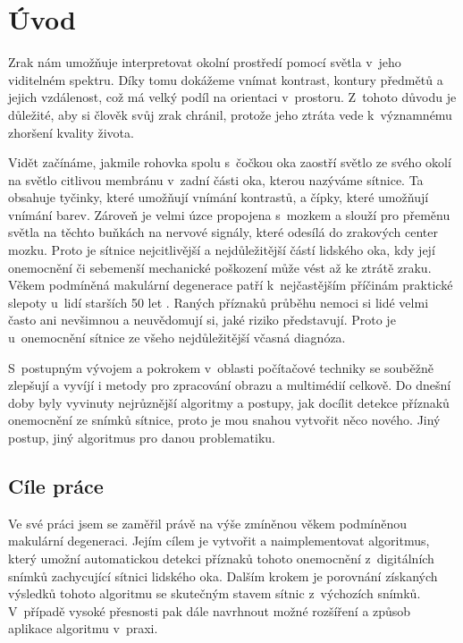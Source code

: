 \chapter{Úvod}
Zrak nám umožňuje interpretovat okolní prostředí pomocí světla v~jeho viditelném spektru. Díky tomu dokážeme vnímat kontrast, kontury předmětů a jejich vzdálenost, což má velký podíl na orientaci v~prostoru. Z~tohoto důvodu je důležité, aby si člověk svůj zrak chránil, protože jeho ztráta vede k~významnému zhoršení kvality života. 

Vidět začínáme, jakmile rohovka spolu s~čočkou oka zaostří světlo ze svého okolí na světlo citlivou membránu v~zadní části oka, kterou nazýváme sítnice. Ta obsahuje tyčinky, které umožňují vnímání kontrastů, a čípky, které umožňují vnímání barev. Zároveň je velmi úzce propojena s~mozkem a slouží pro přeměnu světla na těchto buňkách na nervové signály, které odesílá do zrakových center mozku. Proto je sítnice nejcitlivější a nejdůležitější částí lidského oka, kdy její onemocnění či sebemenší mechanické poškození může vést až ke ztrátě zraku. Věkem podmíněná makulární degenerace patří k~nejčastějším příčinám praktické slepoty u~lidí starších 50 let \cite{Atlas}. Raných příznaků průběhu nemoci si lidé velmi často ani nevšimnou a neuvědomují si, jaké riziko představují. Proto je u~onemocnění sítnice ze všeho nejdůležitější včasná diagnóza.

S~postupným vývojem a pokrokem v~oblasti počítačové techniky se souběžně zlepšují a vyvíjí i metody pro zpracování obrazu a multimédií celkově. Do dnešní doby byly vyvinuty nejrůznější algoritmy a postupy, jak docílit detekce příznaků onemocnění ze snímků sítnice, proto je mou snahou vytvořit něco nového. Jiný postup, jiný algoritmus pro danou problematiku.

\section{Cíle práce}
Ve své práci jsem se zaměřil právě na výše zmíněnou věkem podmíněnou makulární degeneraci. Jejím cílem je vytvořit a naimplementovat algoritmus, který umožní automatickou detekci příznaků tohoto onemocnění z~digitálních snímků zachycující sítnici lidského oka. Dalším krokem je porovnání získaných výsledků tohoto algoritmu se skutečným stavem sítnic z~výchozích snímků. V~případě vysoké přesnosti pak dále navrhnout možné rozšíření a způsob aplikace algoritmu v~praxi.

